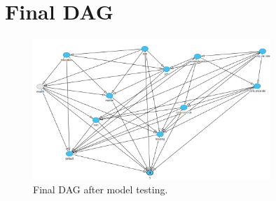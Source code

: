 \documentclass[11pt]{article}
\begin{document}
\section{Final DAG}
\label{sec:final_dag}
\begin{figure}[h]
	\centering
	\includegraphics[width=0.8\textwidth]{images/final_dag}
	\caption{Final DAG after model testing.}
	\label{fig:final_dag}
\end{figure}

\newpage
\end{document}
